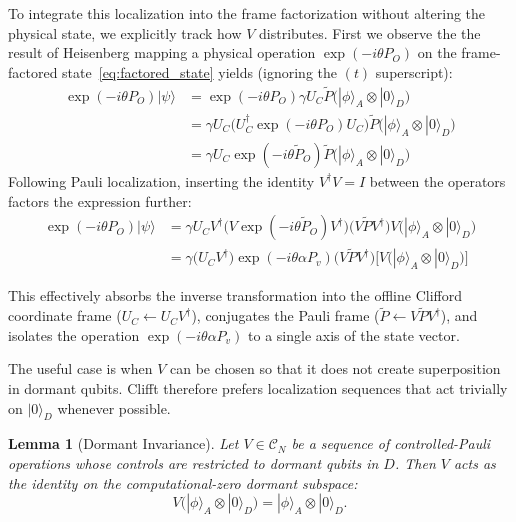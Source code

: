 \documentclass[a4paper, onecolumn, unpublished]{quantumarticle}
\newtheorem{lemma}{Lemma}
\begin{document}
    To integrate this localization into the frame factorization without altering the physical state, we explicitly track how $V$ distributes. First we observe the the result of Heisenberg mapping a physical operation $\exp(-i\theta P_O)$ on the frame-factored state~\ref{eq:factored_state} yields (ignoring the $(t)$ superscript):
    \begin{align}
        \exp(-i\theta P_O) |\psi\rangle &= \exp(-i\theta P_O) \gamma U_C \tilde{P} \Big( |\phi\rangle_A \otimes |0\rangle_D \Big) \nonumber \\
        &= \gamma U_C \Big( U_C^\dagger \exp(-i\theta P_O) U_C \Big) \tilde{P} \Big( |\phi\rangle_A \otimes |0\rangle_D \Big) \nonumber \\
        &= \gamma U_C \exp(-i\theta \tilde{P}_O) \tilde{P} \Big( |\phi\rangle_A \otimes |0\rangle_D \Big)
    \end{align}
    Following Pauli localization, inserting the identity $V^\dagger V = I$ between the operators factors the expression further:
    \begin{align}
        \exp(-i\theta P_O) |\psi\rangle &= \gamma U_C V^\dagger \Big( V \exp(-i\theta \tilde{P}_O) V^\dagger \Big) \Big( V \tilde{P} V^\dagger \Big) V \Big( |\phi\rangle_A \otimes |0\rangle_D \Big) \nonumber \\
        &= \gamma \Big( U_C V^\dagger \Big) \exp(-i\theta \alpha P_v) \Big( V \tilde{P} V^\dagger \Big) \Big[ V \Big( |\phi\rangle_A \otimes |0\rangle_D \Big) \Big]
    \end{align}

    This effectively absorbs the inverse transformation into the offline Clifford coordinate frame ($U_C \leftarrow U_C V^\dagger$), conjugates the Pauli frame ($\tilde{P} \leftarrow V \tilde{P} V^\dagger$), and isolates the operation $\exp(-i\theta \alpha P_v)$ to a single axis of the state vector.

    The useful case is when $V$ can be chosen so that it does not create superposition in dormant qubits. Clifft therefore prefers localization sequences that act trivially on $|0\rangle_D$ whenever possible.
    \begin{lemma}[Dormant Invariance]
        \label{lem:dormant_invariance}
        Let $V \in \mathcal{C}_N$ be a sequence of controlled-Pauli operations whose controls are restricted to dormant qubits in $D$. Then $V$ acts as the identity on the computational-zero dormant subspace:
        \begin{equation}
            V\Big(|\phi\rangle_A \otimes |0\rangle_D\Big)
            =
            |\phi\rangle_A \otimes |0\rangle_D .
        \end{equation}
    \end{lemma}
\end{document}

